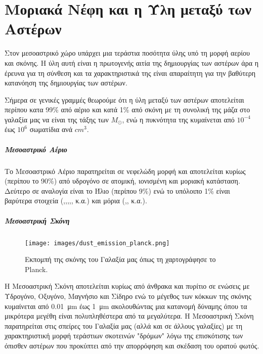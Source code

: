 \documentclass[a4paper,12pt]{memoir}
\newcommand{\sm}{$M_{\odot}$}
\begin{document}
\chapter{Μοριακά Νέφη και η Ύλη μεταξύ των Αστέρων}

Στον μεσοαστρικό χώρο υπάρχει μια τεράστια ποσότητα ύλης  υπό τη μορφή αερίου και σκόνης. Η ύλη αυτή είναι η πρωτογενής αιτία της δημιουργίας των αστέρων άρα η έρευνα για τη σύνθεση και τα χαρακτηριστικά της είναι απαραίτητη για την βαθύτερη κατανόηση της δημιουργίας των αστέρων.

Σήμερα σε γενικές γραμμές θεωρούμε ότι η ύλη μεταξύ των αστέρων αποτελείται περίπου κατα 99\% από αέριο και κατά 1\% από σκόνη με τη συνολική της μάζα στο γαλαξία μας να είναι της τάξης των \sm {}, ενώ η πυκνότητα της κυμαίνεται από $10^{-4}$ έως $10^{6}$ σωματίδια ανά $cm^3$.

\paragraph{Μεσοαστρικό Αέριο} 
Το Μεσοαστρικό Αέριο παρατηρείται σε νεφελώδη μορφή και αποτελείται κυρίως (περίπου το 90\%) από υδρογόνο σε ατομική, ιονισμένη και μοριακή κατάσταση. Δεύτερο σε αναλογία είναι το Ήλιο (περίπου 9\%) ενώ το υπόλοιπο 1\% είναι βαρύτερα στοιχεία (,,,,, κ.α.) και μόρια (,, κ.α.).

\paragraph{Μεσοαστρική Σκόνη}
\begin{figure}[h]
	\centering
	\texttt{[image: images/dust\_emission\_planck.png]}
	\caption{Εκπομπή της σκόνης του Γαλαξία μας όπως τη χαρτογράφησε το Planck.}
\end{figure}

Η Μεσοαστρική Σκόνη αποτελείται κυρίως από άνθρακα και πυρίτιο σε ενώσεις με Υδρογόνο, Οξυγόνο, Μαγνήσιο και Σίδηρο ενώ το μέγεθος των κόκκων της σκόνης κυμαίνεται από \SI{0.01}{\micro\meter} έως \SI{1}{\micro\meter} ακολουθώντας μια κατανομή δύναμης όπου τα μικρότερα μεγέθη είναι πολυπληθέστερα από τα μεγαλύτερα. 
Η Μεσοαστρική Σκόνη παρατηρείται στις σπείρες του Γαλαξία μας (αλλά και σε άλλους γαλαξίες) με τη χαρακτηριστική μορφή τεράστιων σκοτεινών "δρόμων" λόγω της επισκότισης των όπισθεν αστέρων που προκύπτει από την απορρόφηση και σκέδαση του ορατού φωτός.
\end{document}
